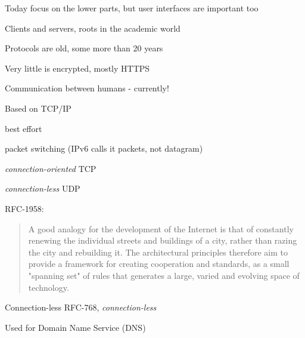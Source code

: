 \documentclass[Screen16to9,17pt]{foils}
\begin{document}
\centerline{Today focus on the lower parts, but user interfaces are important too}




\begin{list2}
\item Clients and servers, roots in the academic world
\item Protocols are old, some more than 20 years
\item Very little is encrypted, mostly HTTPS
\end{list2}




\begin{list1}
\item Communication between humans - currently!
\item Based on TCP/IP
\begin{list2}
\item best effort
\item packet switching (IPv6 calls it packets, not datagram)
\item \emph{connection-oriented} TCP
\item \emph{connection-less} UDP
\end{list2}
\end{list1}

RFC-1958:
\begin{quote}
 A good analogy for the development of the Internet is that of
 constantly renewing the individual streets and buildings of a city,
 rather than razing the city and rebuilding it. The architectural
 principles therefore aim to provide a framework for creating
 cooperation and standards, as a small "spanning set" of rules that
 generates a large, varied and evolving space of technology.
\end{quote}









\begin{list1}
\item Connection-less RFC-768, \emph{connection-less}
\item Used for Domain Name Service (DNS)
\end{list1}
\end{document}
